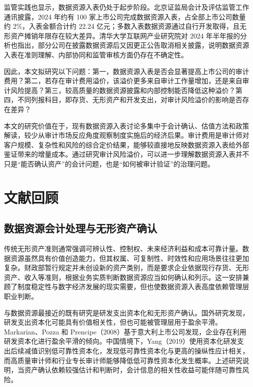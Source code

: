 \documentclass[UTF8,zihao=-4,a4paper]{ctexart}
\begin{document}
监管实践也显示，数据资源入表仍处于起步阶段。北京证监局会计及评估监管工作通讯披露，2024 年约有 100 家上市公司完成数据资源入表，占全部上市公司数量约 2\%，入表金额合计约 22.24 亿元；多数入表数据资源通过自行开发取得，且无形资产摊销年限存在较大差异。清华大学互联网产业研究院对 2024 年半年报的分析也指出，部分公司在披露数据资源后又因更正公告取消相关披露，说明数据资源入表在准则理解、内部协同和监管审核方面仍存在不确定性。

因此，本文拟研究以下问题：第一，数据资源入表是否会显著提高上市公司的审计费用？第二，若存在审计费用溢价，该溢价更多来自审计工作量增加，还是来自审计风险提高？第三，较高质量的数据资源披露和内部控制能否降低这种溢价？第四，不同列报科目，即存货、无形资产和开发支出，对审计风险溢价的影响是否存在差异？

本文的研究价值在于，现有数据资源入表讨论多集中于会计确认、估值方法和政策解读，较少从审计市场反应角度观察制度实施后的经济后果。审计费用是审计师对客户规模、复杂性和风险的综合定价结果，能够较直接地反映数据资源入表给外部鉴证带来的增量成本。通过研究审计风险溢价，可以进一步理解数据资源入表并不只是``能否确认资产''的会计问题，也是``如何被审计验证''的治理问题。

\section{文献回顾}

\subsection{数据资源会计处理与无形资产确认}

传统无形资产准则通常强调可辨认性、控制权、未来经济利益和成本可靠计量。数据资源虽然具有价值创造能力，但其权属、可复制性、时效性和应用场景往往更加复杂。财政部暂行规定并未创设新的资产类别，而是要求企业依据现行存货、无形资产、收入等准则，根据业务实质判断数据资源应当如何确认和列示。这一安排兼顾了制度稳定性与数字经济发展的现实需要，但也使数据资源入表高度依赖管理层职业判断。

与数据资源最接近的既有研究是研发支出资本化和无形资产确认。国外研究发现，研发支出资本化可能具有价值相关性，但也可能被管理层用于盈余平滑。Markarian、Pozza 和 Prencipe（2008）基于意大利上市公司发现，企业存在利用研发资本化进行盈余平滑的倾向。中国情境下，Yang（2019）使用资本化研发支出后续减值识别低可靠性资本化，发现低可靠性资本化与更高的操纵性应计相关，而高质量审计师和行业专长审计师能够降低低可靠性资本化发生概率。上述研究说明，当资产确认依赖较强估计和判断时，会计信息的相关性收益可能伴随可靠性风险。
\end{document}
